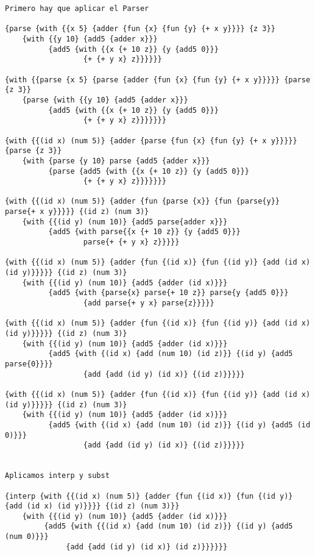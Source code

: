 \documentclass[letterpaper,11pt]{article}
\begin{document}
\begin{verbatim}
Primero hay que aplicar el Parser

{parse {with {{x 5} {adder {fun {x} {fun {y} {+ x y}}}} {z 3}}
    {with {{y 10} {add5 {adder x}}}
          {add5 {with {{x {+ 10 z}} {y {add5 0}}}
                  {+ {+ y x} z}}}}}}
                  
{with {{parse {x 5} {parse {adder {fun {x} {fun {y} {+ x y}}}}} {parse {z 3}}
    {parse {with {{y 10} {add5 {adder x}}}
          {add5 {with {{x {+ 10 z}} {y {add5 0}}}
                  {+ {+ y x} z}}}}}}}
                  
{with {{(id x) (num 5)} {adder {parse {fun {x} {fun {y} {+ x y}}}}} {parse {z 3}}
    {with {parse {y 10} parse {add5 {adder x}}}
          {parse {add5 {with {{x {+ 10 z}} {y {add5 0}}}
                  {+ {+ y x} z}}}}}}}
                  
{with {{(id x) (num 5)} {adder {fun {parse {x}} {fun {parse{y}} parse{+ x y}}}}} {(id z) (num 3)}
    {with {{(id y) (num 10)} {add5 parse{adder x}}}
          {add5 {with parse{{x {+ 10 z}} {y {add5 0}}}
                  parse{+ {+ y x} z}}}}}

{with {{(id x) (num 5)} {adder {fun {(id x)} {fun {(id y)} {add (id x) (id y)}}}}} {(id z) (num 3)}
    {with {{(id y) (num 10)} {add5 {adder (id x)}}}
          {add5 {with {parse{x} parse{+ 10 z}} parse{y {add5 0}}}
                  {add parse{+ y x} parse{z}}}}}
                  
{with {{(id x) (num 5)} {adder {fun {(id x)} {fun {(id y)} {add (id x) (id y)}}}}} {(id z) (num 3)}
    {with {{(id y) (num 10)} {add5 {adder (id x)}}}
          {add5 {with {(id x) {add (num 10) (id z)}} {(id y) {add5 parse{0}}}}
                  {add {add (id y) (id x)} {(id z)}}}}}
                  
{with {{(id x) (num 5)} {adder {fun {(id x)} {fun {(id y)} {add (id x) (id y)}}}}} {(id z) (num 3)}
    {with {{(id y) (num 10)} {add5 {adder (id x)}}}
          {add5 {with {(id x) {add (num 10) (id z)}} {(id y) {add5 (id 0)}}}
                  {add {add (id y) (id x)} {(id z)}}}}}


Aplicamos interp y subst

{interp {with {{(id x) (num 5)} {adder {fun {(id x)} {fun {(id y)} {add (id x) (id y)}}}} {(id z) (num 3)}}
    {with {{(id y) (num 10)} {add5 {adder (id x)}}}
         {add5 {with {{(id x) {add (num 10) (id z)}} {(id y) {add5 (num 0)}}}
              {add {add (id y) (id x)} (id z)}}}}}}
              

\end{verbatim}
\end{document}
